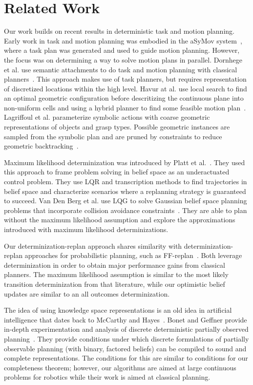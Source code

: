 \section{Related Work}
Our work builds on recent results in deterministic task and motion
planning. Early work in task and motion planning was embodied in the
aSyMov system~\cite{gravot2005asymov}, where a task plan was generated
and used to guide motion planning. However, the focus was on
determining a way to solve motion plans in parallel. Dornhege et
al. use semantic attachments to do task and motion planning with
classical planners~\cite{dornhege2012semantic}. This approach makes
use of task planners, but requires representation of discretized
locations within the high level. Havur at al. use local search to find an optimal geometric configuration before descritizing the continuous plane into non-uniform cells and using a hybrid planner to find some feasible motion plan~\cite{havur2014geometric}. Lagriffoul et al. parameterize symbolic actions with coarse geometric representations of objects and grasp types. Possible geometric instances are sampled from the symbolic plan and are pruned by constraints to reduce geometric backtracking~\cite{lagriffoul2014orientation}.

Maximum likelihood determinization was introduced by Platt et
al.~\cite{platt2010belief}. They used this approach to frame problem
solving in belief space as an underactuated control problem. They use
LQR and transcription methods to find trajectories in belief space and
characterize scenarios where a replanning strategy is guaranteed to
succeed. Van Den Berg et al. use LQG to solve Gaussian belief space
planning problems that incorporate collision avoidance
constraints~\cite{van2012motion}. They are able to plan without
the maximum likelihood assumption and explore the approximations
introduced with maximum likelihood determinizations.

Our determinization-replan approach shares similarity with
determinization-replan approaches for probabilistic planning, such as
FF-replan~\cite{yoon2007ff}. Both leverage determinization in order to
obtain major performance gains from classical planners. The maximum
likelihood assumption is similar to the most likely transition
determinization from that literature, while our optimistic belief
updates are similar to an all outcomes determinization.

The idea of using knowledge space representations is an old idea in
artificial intelligence that dates back to McCarthy and
Hayes~\cite{mccarthy1968some}. Bonet and Geffner provide in-depth
experimentation and analysis of discrete deterministic partially
observed planning~\cite{bonet2011planning}.  They provide conditions
under which discrete formulations of partially observable planning
(with binary, factored beliefs) can be compiled to sound and complete
representations. The conditions for this are similar to conditions
for our completeness theorem; however, our algorithms are aimed at
large continuous problems for robotics while their work is aimed at
classical planning.

